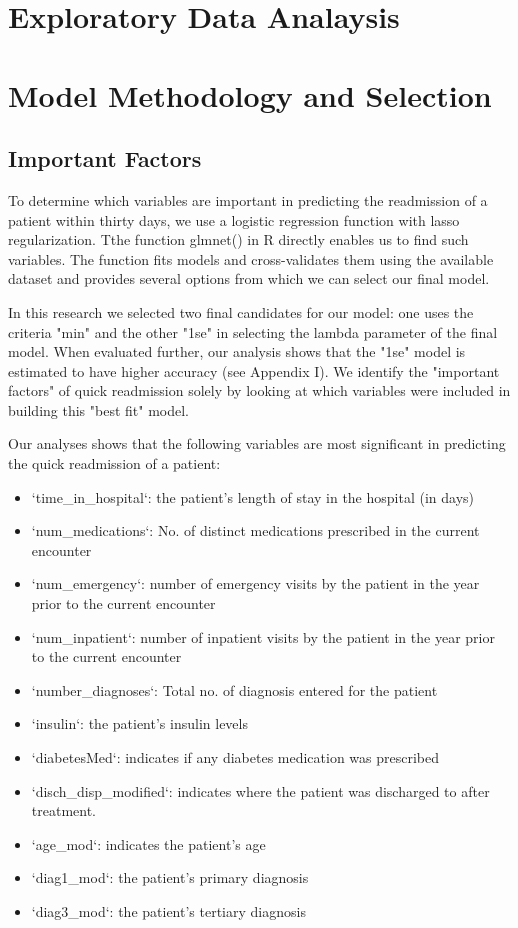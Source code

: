 \documentclass{article}
\begin{document}
\section{Exploratory Data Analaysis}
\section{Model Methodology and Selection}

\subsection{Important Factors}
To determine which variables are important in predicting the readmission of a patient within thirty days, we use a logistic regression function with lasso regularization. Tthe function glmnet() in R directly enables us to find such variables. The function fits models and cross-validates them using the available dataset and provides several options from which we can select our final model. \newline

In this research we selected two final candidates for our model: one uses the criteria "min" and the other "1se"  in selecting the lambda parameter of the final model. When evaluated further, our analysis shows that the "1se" model is estimated to have higher accuracy (see Appendix I). We identify the "important factors" of quick readmission solely by looking at which variables were included in building this "best fit" model. \newline

Our analyses shows that the following variables are most significant in predicting the quick readmission of a patient:

\begin{itemize}
 
\item `time\_in\_hospital`: the patient’s length of stay in the hospital (in days)
\item `num\_medications`: No. of distinct medications prescribed in the current encounter
\item `num\_emergency`: number of emergency visits by the patient in the year prior to the current encounter
\item `num\_inpatient`: number of inpatient visits by the patient in the year prior to the current encounter
\item `number\_diagnoses`: Total no. of diagnosis entered for the patient
\item `insulin`: the patient's insulin levels
\item `diabetesMed`: indicates if any diabetes medication was prescribed 
\item `disch\_disp\_modified`: indicates where the patient was discharged to after treatment.
\item `age\_mod`: indicates the patient's age
\item `diag1\_mod`: the patient's primary diagnosis
\item `diag3\_mod`: the patient's tertiary diagnosis
\end{itemize}
\end{document}
